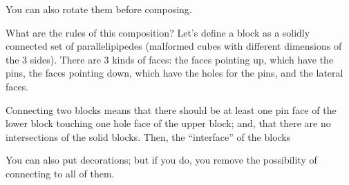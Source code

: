 
You can also rotate them before composing.


What are the rules of this composition? Let's define a block as a solidly connected set of parallelipipedes (malformed cubes with different dimensions of the 3 sides). There are 3 kinds of faces: the faces pointing up, which have the pins, the faces pointing down, which have the holes for the pins, and the lateral faces.

Connecting two blocks means that there should be at least one pin face of the lower block touching one hole face of the upper block; and, that there are no intersections of the solid blocks. Then, the ``interface'' of the blocks


You can also put decorations; but if you do, you remove the possibility of connecting to all of them.



